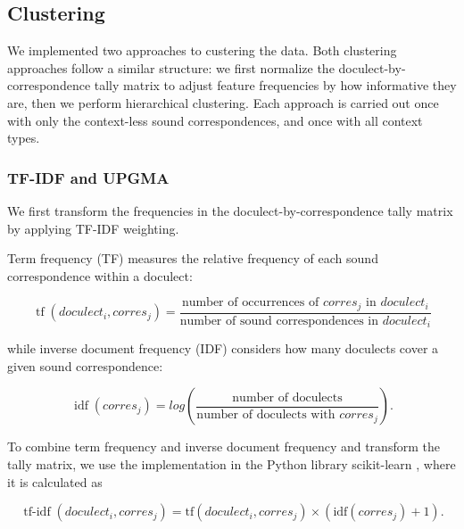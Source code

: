 \documentclass[a4paper]{article}
\begin{document}

\subsection{Clustering}

We implemented two approaches to custering the data.
Both clustering approaches follow a similar structure:
we first normalize the doculect-by-correspondence tally matrix
to adjust feature frequencies by how informative they are,
then we perform hierarchical clustering.
Each approach is carried out once with only
the context-less sound correspondences,
and once with all context types.

\subsubsection{TF-IDF and UPGMA}

We first transform the frequencies
in the doculect-by-correspondence tally matrix
by applying TF-IDF weighting.


Term frequency (TF) measures the relative frequency
of each sound correspondence within a doculect:

\begin{equation*}
\operatorname{tf}(doculect_i, corres_j) =
\frac{\text{number of occurrences of } corres_j \text{ in } doculect_i}
{\text{number of sound correspondences in } doculect_i}
\end{equation*}

while inverse document frequency (IDF)
considers how many doculects cover a given
sound correspondence:

\begin{equation*}
\operatorname{idf}(corres_j) =
log(
\frac{\text{number of doculects}}
{\text{number of doculects with } corres_j}
).
\end{equation*}

To combine term frequency and inverse document frequency
and transform the tally matrix, 
we use the implementation in the Python library scikit-learn
\citep{pedregosa2011scikit-learn},
where it is calculated as

\begin{equation*}
\operatorname{tf-idf}(doculect_i, corres_j) =
\text{tf}(doculect_i, corres_j)
\times
(
\text{idf}(corres_j)
+ 1).
\end{equation*}
\end{document}
